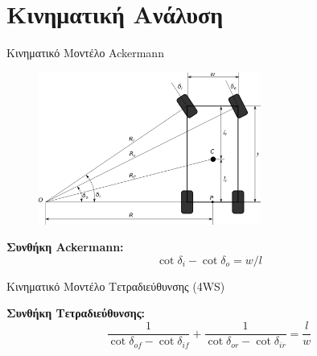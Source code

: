 \documentclass[10pt, compress]{beamer}
\begin{document}
\section{Κινηματική Ανάλυση}

\begin{frame}{Κινηματικό Μοντέλο Ackermann}
	\begin{figure}
		\includegraphics[height=5cm]{Figures/ackermann_model.png}
	\end{figure}
	\textbf{Συνθήκη Ackermann:}
	\begin{equation*}
		\cot{\delta_i} - \cot{\delta_o} = w / l
	\end{equation*}
\end{frame}

\begin{frame}{Κινηματικό Μοντέλο Τετραδιεύθυνσης (4WS)}
	\begin{figure}[!ht]
	\end{figure}
	\textbf{Συνθήκη Τετραδιεύθυνσης:}
	\begin{equation*}
		\frac{1}{\cot{\delta_{of}} - \cot{\delta_{if}}} + \frac{1}{\cot{\delta_{or}} - 	\cot{\delta_{ir}}} = \frac{l}{w}
	\end{equation*}
\end{frame}
\end{document}
